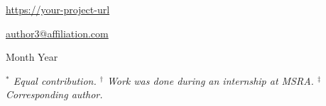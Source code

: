 \documentclass[11pt]{article}
\begin{document}
\vspace{0.45em}
\begin{msfttitlebox}
\setlength{\parindent}{0cm}
\setlength{\parskip}{0.14cm}
\raggedright
\nohyphens



\vspace{0.14cm}
{\setlength{\parskip}{0.06cm}\small
{\href{https://your-project-url}{https://your-project-url}\par}
{
\href{mailto:author3@affiliation.com}{author3@affiliation.com}\par}
{Month Year\par}                %
}
\vspace{0.08cm}
{\footnotesize\rmfamily\itshape\color{msftgray}
$^*$ Equal contribution. \quad
$^{\dagger}$ Work was done during an internship at MSRA. \quad
$^{\ddagger}$ Corresponding author.\par
}
\end{msfttitlebox}
\suppressfloats[t]  %








\FloatBarrier  %




\end{document}
